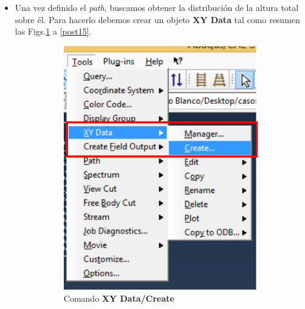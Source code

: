 \begin{itemize}
\item Una vez definido el \textit{path}, buscamos obtener la
  distribución de la altura total sobre él. Para hacerlo debemos crear
  un objeto \textbf{XY Data} tal como resumen las Figs.\ref{post11} a
  \ref{post15}.
  \begin{figure}[!h]
    \centering
    \begin{subfigure}[!h]{0.21\textwidth}
      \includegraphics[width=\textwidth]{./body/images/post11.pdf}
      \caption{Comando \textbf{XY Data/Create}}
      \label{post11}
    \end{subfigure}%
    \begin{subfigure}[!h]{0.35\textwidth}

\end{subfigure}
\end{figure}
\end{itemize}
